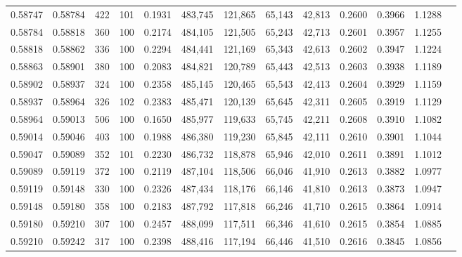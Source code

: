 \begin{tabular}{rrrrrrrrrrrrr}
0.58747 & 0.58784 &   422 & 101 &                                     0.1931 & 483,745 & 121,865 &  65,143 &  42,813 & 0.2600 & 0.3966 & 1.1288 \\
0.58784 & 0.58818 &   360 & 100 &                                     0.2174 & 484,105 & 121,505 &  65,243 &  42,713 & 0.2601 & 0.3957 & 1.1255 \\
0.58818 & 0.58862 &   336 & 100 &                                     0.2294 & 484,441 & 121,169 &  65,343 &  42,613 & 0.2602 & 0.3947 & 1.1224 \\
0.58863 & 0.58901 &   380 & 100 &                                     0.2083 & 484,821 & 120,789 &  65,443 &  42,513 & 0.2603 & 0.3938 & 1.1189 \\
0.58902 & 0.58937 &   324 & 100 &                                     0.2358 & 485,145 & 120,465 &  65,543 &  42,413 & 0.2604 & 0.3929 & 1.1159 \\
0.58937 & 0.58964 &   326 & 102 &                                     0.2383 & 485,471 & 120,139 &  65,645 &  42,311 & 0.2605 & 0.3919 & 1.1129 \\
0.58964 & 0.59013 &   506 & 100 &                                     0.1650 & 485,977 & 119,633 &  65,745 &  42,211 & 0.2608 & 0.3910 & 1.1082 \\
0.59014 & 0.59046 &   403 & 100 &                                     0.1988 & 486,380 & 119,230 &  65,845 &  42,111 & 0.2610 & 0.3901 & 1.1044 \\
0.59047 & 0.59089 &   352 & 101 &                                     0.2230 & 486,732 & 118,878 &  65,946 &  42,010 & 0.2611 & 0.3891 & 1.1012 \\
0.59089 & 0.59119 &   372 & 100 &                                     0.2119 & 487,104 & 118,506 &  66,046 &  41,910 & 0.2613 & 0.3882 & 1.0977 \\
0.59119 & 0.59148 &   330 & 100 &                                     0.2326 & 487,434 & 118,176 &  66,146 &  41,810 & 0.2613 & 0.3873 & 1.0947 \\
0.59148 & 0.59180 &   358 & 100 &                                     0.2183 & 487,792 & 117,818 &  66,246 &  41,710 & 0.2615 & 0.3864 & 1.0914 \\
0.59180 & 0.59210 &   307 & 100 &                                     0.2457 & 488,099 & 117,511 &  66,346 &  41,610 & 0.2615 & 0.3854 & 1.0885 \\
0.59210 & 0.59242 &   317 & 100 &                                     0.2398 & 488,416 & 117,194 &  66,446 &  41,510 & 0.2616 & 0.3845 & 1.0856 \\

\end{tabular}
